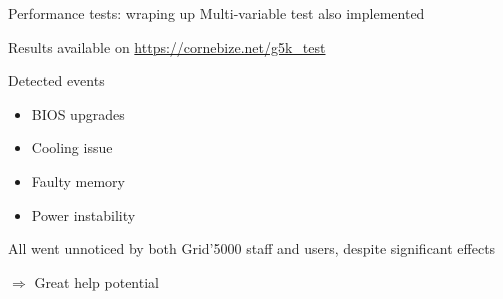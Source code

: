 \documentclass[10pt]{beamer}
\begin{document}
\begin{frame}{Performance tests: wraping up}
    Multi-variable test also implemented
    \pause

    Results available on \alert{\url{https://cornebize.net/g5k\_test}}

    \begin{minipage}{0.55\linewidth}
    \end{minipage} \hfill\pause%
    \begin{minipage}{0.4\linewidth}
        \begin{block}{Detected events}
            \begin{itemize}
                \item BIOS upgrades
                \item Cooling issue
                \item Faulty memory
                \item Power instability
            \end{itemize}
            \pause

            All went unnoticed by both Grid'5000 staff and users, despite significant effects

            \alert{\(\Rightarrow\) Great help potential}
        \end{block}
    \end{minipage}

\end{frame}
\end{document}
